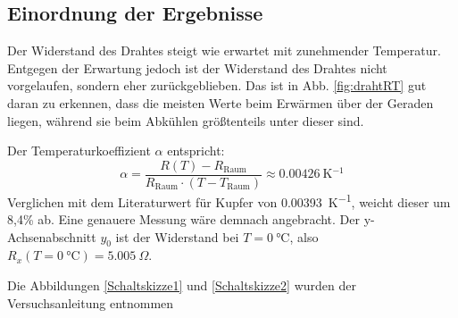 \documentclass[11pt,a4paper,titlepage, ngerman]{article}
\begin{document}
		\subsection{Einordnung der Ergebnisse}	
			
			Der Widerstand des Drahtes steigt wie erwartet mit zunehmender Temperatur. 
			Entgegen der Erwartung jedoch ist der Widerstand des Drahtes nicht vorgelaufen, sondern eher zurückgeblieben.
			Das ist in Abb. \ref{fig:drahtRT} gut daran zu erkennen, dass die meisten Werte beim Erwärmen über der Geraden liegen, während sie beim Abkühlen größtenteils unter dieser sind.
			
			Der Temperaturkoeffizient $\alpha$ entspricht:
			\begin{equation*}
				\alpha = \frac{R(T)-R_\text{Raum}}{R_\text{Raum}\cdot (T-T_\text{Raum})} \approx \SI{0,00426}{\K^{-1}}
			\end{equation*} 
			Verglichen mit dem Literaturwert für Kupfer von \SI{0,00393}{\K^{-1}}, weicht dieser um 8,4\% ab. Eine genauere Messung wäre demnach angebracht.
			Der y-Achsenabschnitt $y_0$ ist der Widerstand bei $T=\SI{0}{\celsius}$, also $R_x(T=\SI{0}{\celsius}) = \SI{5,005}{\Omega}$.
		
	\begin{thebibliography}	{}
		Die Abbildungen \ref{Schaltskizze1} und \ref{Schaltskizze2} wurden der Versuchsanleitung entnommen
	\end{thebibliography}	
			
\end{document}

